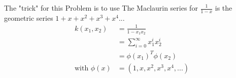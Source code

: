 %
%
%
\begin{flushleft}
The "trick" for this Problem is to use The Maclaurin series for 
$\frac{1}{1-x}$ is the geometric series $1 + x + x^2 + x^3 + x^4 ...$
\begin{align*}
k(x_1,x_2)&=\frac{1}{1-x_1 x_2}\\
&= \sum_{i=0}^{\infty}x_1^i x_2^i\\
&= \phi(x_1)^T \phi(x_2)\\
\text{with } \phi(x)&=(1,x,x^2,x^3,x^4, ...)
\end{align*}
\end{flushleft}
%
%



